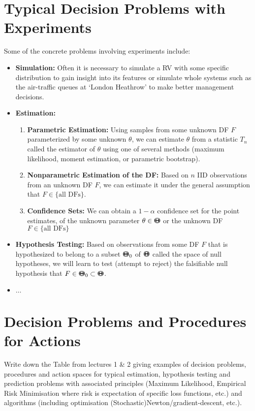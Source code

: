 \section{Typical Decision Problems with Experiments}
Some of the concrete problems involving experiments include:
\begin{itemize}
\item {\bf Simulation:} Often it is necessary to simulate a RV with some specific distribution to gain insight into its features or simulate whole systems such as the air-traffic queues at `London Heathrow' to make better management decisions.
\item {\bf Estimation:} 
\begin{enumerate}
\item {\bf Parametric Estimation:} Using samples from some unknown DF $F$ parameterized by some unknown $\theta$, we can estimate $\theta$ from a statistic $T_n$ called the estimator of $\theta$ using one of several methods (maximum likelihood, moment estimation, or parametric bootstrap).
\item {\bf Nonparametric Estimation of the DF:}  Based on $n$ IID observations from an unknown DF $F$, we can estimate it under the general assumption that $F \in \{ \text{all DFs} \}$.
\item {\bf Confidence Sets:}  We can obtain a $1-\alpha$ confidence set for the point estimates, of the unknown parameter $\theta \in {\Theta}\mspace{-11 mu}{\Theta}$ or the unknown  DF $F \in \{ \text{all DFs} \}$
\end{enumerate}
\item {\bf Hypothesis Testing:}  Based on observations from some DF $F$ that is hypothesized to belong to a subset ${\Theta}\mspace{-11 mu}{\Theta}_0$ of ${\Theta}\mspace{-11 mu}{\Theta}$ called the space of null hypotheses, we will learn to test (attempt to reject) the falsifiable null hypothesis that $F \in {\Theta}\mspace{-11 mu}{\Theta}_0 \subset {\Theta}\mspace{-11 mu}{\Theta}$.
\item $\ldots $ 
\end{itemize}


\section{Decision Problems and Procedures for Actions}\label{S:Decisions}

Write down the Table from lectures 1 \& 2 giving examples of decision problems, procedures and action spaces for typical estimation, hypothesis testing and prediction problems with associated principles (Maximum Likelihood, Empirical Risk Minimisation where risk is expectation of specific loss functions, etc.) and algorithms (including optimisation (Stochastic)Newton/gradient-descent, etc.).

\vspace{10cm}~\\


